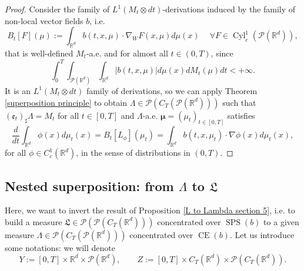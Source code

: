 \documentclass[10pt,leqno]{amsart}
\numberwithin{equation}{section}
\newcommand{\R}{\mathbb{R}}
\newcommand{\PP}{\mathcal{P}}
\begin{document}
\begin{proof}
    Consider the family of $L^1(M_t\otimes dt)$-derivations induced by the family of non-local vector fields $b$, i.e. 
\begin{equation}
    B_t[F](\mu) := \int_{\R^d} b(t,x,\mu) \cdot \nabla_W F(x,\mu) d\mu(x) \ \quad \forall F\in \operatorname{Cyl}_c^1(\PP(\R^d)),
\end{equation}
that is well-defined $M_t$-a.e. and for almost all $t\in (0,T)$, since 
\begin{equation}
    \int_0^T \int_{\PP(\R^d)}\int_{\R^d}|b(t,x,\mu)| d\mu(x) dM_t(\mu) dt<+\infty.
\end{equation}
It is an $L^1(M_t\otimes dt)$ family of derivations, so we can apply Theorem \ref{superposition principle} to obtain $\Lambda \in \PP(C_T(\PP(\R^d)))$ such that $(\mathfrak{e}_t)_\sharp \Lambda = M_t$ for all $t\in [0,T]$ and $\Lambda$-a.e. $\boldsymbol{\mu}= (\mu_t)_{t\in [0,T]}$ satisfies
\[\frac{d}{dt}\int_{\R^d}\phi(x) d\mu_t(x) = B_t[L_\phi](\mu_t) = \int_{\R^d} b(t,x,\mu_t)\cdot \nabla\phi(x) d\mu_t(x), \]
for all $\phi\in C_c^1(\R^d)$, in the sense of distributions in $(0,T)$.
\end{proof}


\subsection{Nested superposition: from \texorpdfstring{$\Lambda$}{} to \texorpdfstring{$\mathfrak{L}$}{}}\label{subsec: from mathfrak L to Lambda} 
Here, we want to invert the result of Proposition \ref{L to Lambda section 5}, i.e. to build a measure $\mathfrak{L}\in \PP(\PP(C_T(\R^d)))$ concentrated over $\operatorname{SPS}(b)$ to a given measure $\Lambda \in \PP(C_T(\PP(\R^d)))$ concentrated over $\operatorname{CE}(b)$.
Let us introduce some notations: we will denote 
\begin{equation}\label{eq: def of Y and Z}
    Y:= [0,T]\times \R^d \times \PP(\R^d), \quad \quad Z:= [0,T]\times C_T(\R^d) \times \PP(C_T(\R^d)).
\end{equation}
\end{document}
